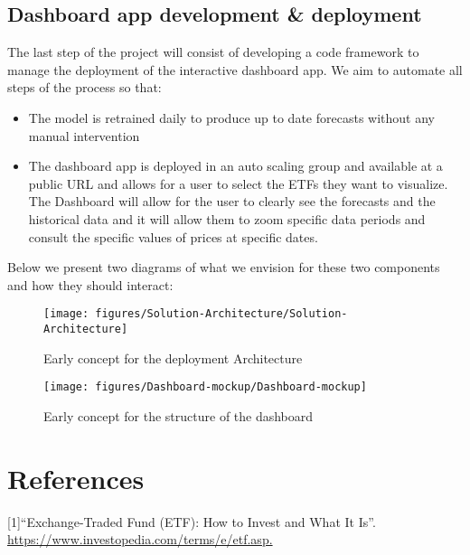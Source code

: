 \documentclass[10pt]{article}
\providecommand{\tightlist}{\setlength{\itemsep}{0pt}\setlength{\parskip}{0pt}}%
\begin{document}
\hypertarget{dashboard-app-development-deployment}{%
\subsection*{Dashboard app development \&
deployment}}

{\label{177371}}

The last step of the project will consist of developing a code framework
to manage the deployment of the interactive dashboard app. We aim to
automate all steps of the process so that:

\begin{itemize}
\tightlist
\item
  The model is retrained daily to produce up to date forecasts without
  any manual intervention
\item
  The dashboard app is deployed in an auto scaling group and available
  at a public URL and allows for a user to select the ETFs they want to
  visualize. The Dashboard will allow for the user to clearly see the
  forecasts and the historical data and it will allow them to zoom
  specific data periods and consult the specific values of prices at
  specific dates.
\end{itemize}

Below we present two diagrams of what we envision for these two
components and how they should interact:
\begin{figure}[H]
\begin{center}
\texttt{[image: figures/Solution-Architecture/Solution-Architecture]}
\caption{{Early concept for the deployment Architecture
{\label{582012}}%
}}
\end{center}
\end{figure}
\begin{figure}[H]
\begin{center}
\texttt{[image: figures/Dashboard-mockup/Dashboard-mockup]}
\caption{{Early concept for the structure of the dashboard
{\label{140820}}%
}}
\end{center}
\end{figure}

\FloatBarrier
\section*{References}\sloppy
{}
\label{csl:1}[1]``{Exchange-Traded Fund (ETF): How to Invest and What It Is}''. \url{https://www.investopedia.com/terms/e/etf.asp.}
\end{document}
